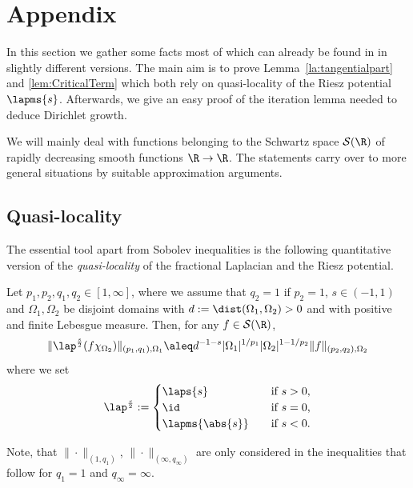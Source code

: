 \section{Appendix}

In this section we gather some facts most of which can already be found in 
\cite{SchikorraIntBoundFrac11} in slightly different versions. The main aim is to prove 
Lemma~\ref{la:tangentialpart} and \ref{lem:CriticalTerm} which both rely on 
quasi-locality of the Riesz potential $\lapms{s}$.  Afterwards, we give an easy proof of the iteration lemma needed
to deduce Dirichlet growth. 

We will mainly deal with functions belonging to the Schwartz space $\mathcal{S}(\R)$
of rapidly decreasing smooth functions $\R\to\R$. The statements carry over to more general situations by suitable approximation arguments.

\subsection{Quasi-locality}

The essential tool apart from Sobolev inequalities is the following 
quantitative version of the \emph{quasi-locality} of the fractional Laplacian 
and the Riesz potential.

\begin{lemma}\label{lem:QuasiLocality}
 Let $p_1,p_2,q_1,q_2 \in [1, \infty]$, where we assume that $q_2 =1$ if $p_2=1$, $s \in (-1,1)$
 and $\Omega_1, \Omega_2$ be disjoint domains with
 $d:= \dist(\Omega_1, \Omega_2) >0$ and with positive and finite Lebesgue measure. 
 Then, for any $f\in\mathcal S(\R)$, 
 \begin{equation*}
  \|\lap^{\frac{s}{2}} (f \chi_{\Omega_2})\|_{(p_1,q_1),\Omega_1} 
  \aleq  d^{-1-s} |\Omega_1|^{1/p_1} |\Omega_2|^{1-1/p_2} \|f\|_{(p_2,q_2), \Omega_2}
 \end{equation*}
  where we set
 \[
  \lap^{\frac{s}{2}} := \begin{cases}
                         \laps{s} \quad &\mbox{if $s > 0$,}\\
			  \id \quad &\mbox{if $s = 0$,}\\
			  \lapms{\abs{s}} \quad &\mbox{if $s < 0$.}\\
                        \end{cases}
 \]
\end{lemma}

Note, that $\|\cdot\|_{(1,q_1)}$, $\|\cdot\|_{(\infty,q_\infty)}$ are only considered
in the inequalities that follow for $q_1=1$ and $q_\infty=\infty$.

